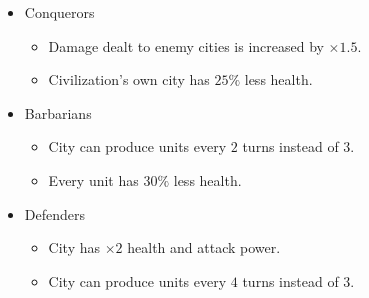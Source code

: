 \documentclass[11pt]{amsart}
\begin{document}
\begin{itemize}
\begin{itemize}
\begin{itemize}
            \item Conquerors
            \begin{itemize}
                \item Damage dealt to enemy cities is increased by $\times 1.5$.
                \item Civilization's own city has $25\%$ less health.
            \end{itemize}
            \item Barbarians
            \begin{itemize}
                \item City can produce units every $2$ turns instead of $3$.
                \item Every unit has $30\%$ less health.
            \end{itemize}
            \item Defenders
            \begin{itemize}
                \item City has $\times 2$ health and attack power.
                \item City can produce units every $4$ turns instead of $3$.
            \end{itemize}
        \end{itemize}


\end{itemize}
\end{itemize}
\end{document}
